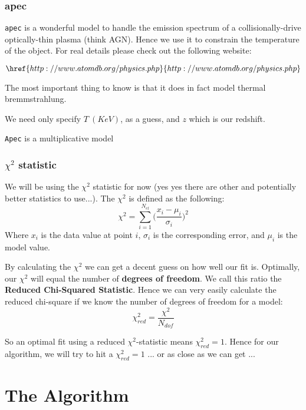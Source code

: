 \documentclass[11pt,letterpaper]{article}
\begin{document}
\subsubsection{apec}
\texttt{apec} is a wonderful model to handle the emission spectrum of a collisionally-drive optically-thin plasma (think AGN). Hence we use it to constrain the temperature of the object. For real details please check out the following website:

$$\href{http://www.atomdb.org/physics.php}{http://www.atomdb.org/physics.php} $$

The most important thing to know is that it does in fact model thermal bremmstrahlung. 

We need only  specify $T \ (KeV)$, as a guess, and $z$ which is our redshift.

\texttt{Apec} is a multiplicative model

\subsubsection{$\chi^2$ statistic}
We will be using the $\chi^2$ statistic for now (yes yes there are other and potentially better statistics to use...). The $\chi^2$ is defined as the following:
\begin{equation}
	\chi^2 = \sum_{i=1}^{N_{el}} \Bigg(  \frac{x_i-\mu_i}{\sigma_i}  \Bigg)^2
\end{equation}
Where $x_i$ is the data value at point $i$, $\sigma_i$ is the corresponding error, and $\mu_i$ is the model value.

By calculating the $\chi^2$ we can get a decent  guess on how well our fit is. Optimally, our $\chi^2$ will equal the number of \textbf{degrees of freedom}. We call this ratio the \textbf{Reduced Chi-Squared Statistic}. Hence we can very easily calculate the reduced chi-square if we know the number of degrees of freedom for a model:
\begin{equation}
	\chi^2_{red} = \frac{\chi^2}{N_{dof}}
\end{equation}

So an optimal fit using a reduced $\chi^2$-statistic means $\chi^2_{red} = 1$. Hence for our algorithm, we will try to hit a $\chi^2_{red} = 1$ ... or as close as we can get ... 



\section{The Algorithm}
\end{document}
